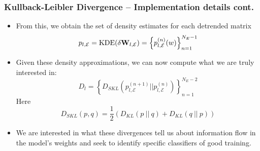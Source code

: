 \documentclass[11pt,aspectratio=169]{beamer}
\newcommand{\parens}[1]{\left(#1\right)}
\newcommand{\bracks}[1]{\left\{#1\right\}}
\begin{document}
    \begin{frame}
        \frametitle{Kullback-Leibler Divergence -- Implementation details cont.}
        \begin{itemize}
            \item 
            From this, we obtain the set of density estimates for each detrended 
            matrix
            \begin{equation}
                p_{l,\mathcal{E}} = \text{KDE}(\delta{\bf W}_{l, \mathcal{E}}) = \bracks{p_{l,\mathcal{E}}^{(n)}(w)}_{n=1}^{N_E-1}
            \end{equation}
            \item
            Given these density approximations, we 
            can now compute what we are truly interested in:
            \begin{equation}
                D_l = \bracks{D_{SKL}\parens{p_{l,\mathcal{E}}^{(n+1)} \Big|\!\Big| p_{l,\mathcal{E}}^{(n)}}}_{n=1}^{N_E-2}
            \end{equation}
            Here 
            \begin{equation}
                D_{SKL}(p, q) = \frac{1}{2}\parens{D_{KL}(p\ |\!|\ q) + D_{KL}(q\ |\!|\ p)}
            \end{equation}
            \item
            We are interested in what these divergences tell us about information flow in the model's weights and 
            seek to identify specific classifiers of good training. 
        \end{itemize}
    \end{frame}

\end{document}
